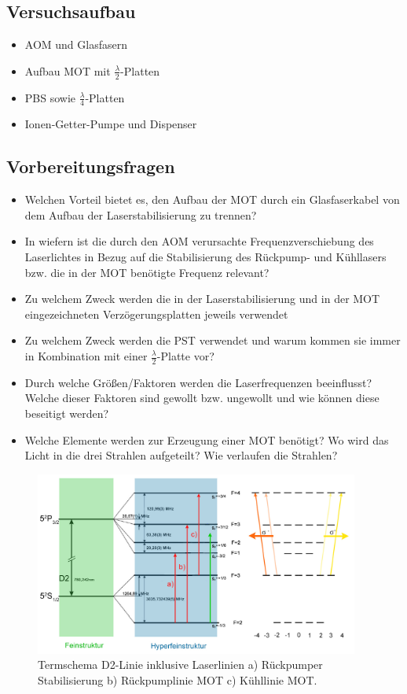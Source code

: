 \documentclass[10pt,a4paper]{extarticle}
\begin{document}
\subsection*{Versuchsaufbau}
\begin{itemize}
\item AOM und Glasfasern
\item Aufbau MOT mit $\frac{\lambda}{2}$-Platten
\item PBS sowie $\frac{\lambda}{4}$-Platten 
\item Ionen-Getter-Pumpe und Dispenser
\end{itemize}

\subsection*{Vorbereitungsfragen}
\begin{itemize}
\item Welchen Vorteil bietet es, den Aufbau der MOT durch ein Glasfaserkabel von dem Aufbau der Laserstabilisierung zu trennen?
\item In wiefern ist die durch den AOM verursachte Frequenzverschiebung des Laserlichtes in Bezug auf die Stabilisierung des Rückpump- und Kühllasers bzw. die in der MOT benötigte Frequenz relevant?
\item Zu welchem Zweck werden die in der Laserstabilisierung und in der MOT eingezeichneten Verzögerungsplatten jeweils verwendet
\item Zu welchem Zweck werden die PST verwendet und warum kommen sie immer in Kombination mit einer $\frac{\lambda}{2}$-Platte vor?
\item Durch welche Größen/Faktoren werden die Laserfrequenzen beeinflusst? Welche dieser Faktoren sind gewollt bzw. ungewollt und wie können diese beseitigt werden?
\item Welche Elemente werden zur Erzeugung einer MOT benötigt? Wo wird das Licht in die drei Strahlen aufgeteilt? Wie verlaufen die Strahlen?
\end{itemize}

\begin{figure}[htb!]
	\centering
	\includegraphics[width = 0.95\textwidth]{TS_korrigiert.jpg}
	\caption{Termschema D2-Linie inklusive Laserlinien a) Rückpumper Stabilisierung b) Rückpumplinie MOT c) Kühllinie MOT.}
\end{figure}
\end{document}

